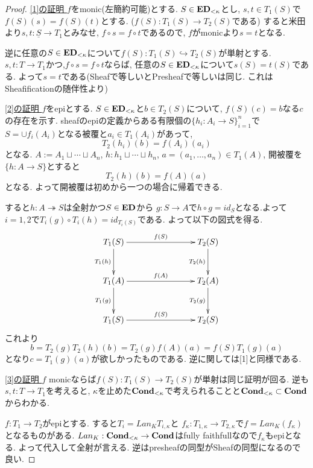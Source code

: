 \documentclass[dvipdfmx,a4paper,11pt]{report}
\theoremstyle{definition}
\begin{document}
 \begin{proof}
 
 \underline{[1]の証明 }
 $f$をmonic(左簡約可能)とする.
$S \in {\bf ED}_{<\kappa}$とし,
$s,t \in T_1(S)$で$f(S)(s)= f(S)(t)$とする. ($f(S) : T_1(S) \to T_2(S)$である)
すると米田より$s,t : \underline{S} \to T_1$とみなせ, $f \circ s = f \circ t$であるので, $f$がmonicより$s=t$となる.

逆に任意の$S \in {\bf ED}_{<\kappa}$について$f(S) : T_1(S) \hookrightarrow T_2(S)$が単射とする.
$s,t : T \to T_1$かつ,$f \circ s = f \circ t$ならば, 任意の$S \in {\bf ED}_{<\kappa}$について$s(S) = t(S)$である. よって$s=t$である(Sheafで等しいとPresheafで等しいは同じ.  これはSheafificationの随伴性より)

 \underline{[2]の証明 }
$f$をepiとする. 
$S \in {\bf ED}_{<\kappa}$と$b \in T_2(S)$について,
$f(S)(c)=b$なる$c$の存在を示す. 
sheafのepiの定義からある有限個の$\{h_i : A_i \to S \}_{i=1}^{n}$で$S=\cup f_i(A_i)$となる被覆と$a_i \in T_1(A_i)$があって, 
$$
T_2(h_i)(b) = f(A_i)(a_i)
$$
となる.
$A:= A_1 \sqcup \cdots \sqcup A_n$, $h : h_1 \sqcup \cdots \sqcup h_n$, $a=(a_1, \ldots, a_n)\in T_{1}(A)$, 
開被覆を$\{ h: A \to S \}$とすると
$$
T_2(h)(b)=f(A)(a) 
$$
となる. よって開被覆は初めから一つの場合に帰着できる.
 
 すると$h : A \twoheadrightarrow S$は全射かつ$S \in { \bf ED}$から
 $g : S \to A$で$h \circ g = id_{S}$となる.よって$i=1,2$で$T_i(g) \circ T_i(h) = id_{T_i(S)}$である.
 よって以下の図式を得る.
 \begin{equation*}
 \xymatrix@C=80pt@R=30pt{
T_1(S)\ar@{->}[r]^{f(S)}
\ar@{->}[d]_{T_1(h)}
&T_2(S)\ar@{->}[d]_{T_2(h)}
 \\   
T_1(A) \ar@{->}[r]^{f(A)}
\ar@{->}[d]_{T_1(g)}
&T_2(A)\ar@{->}[d]_{T_2(g)}
\\
T_1(S)\ar@{->}[r]^{f(S)}
&T_2(S)
 \\   
}
\end{equation*}
これより
$$
b=  T_2(g)T_2(h)(b)
=T_2(g)f(A)(a)
 =f(S)T_1(g)(a)
$$
となり$ c = T_1(g)(a)$が欲しかったものである.
逆に関しては[1]と同様である.

 \underline{[3]の証明 }
$f$ monicならば$f(S) : T_1(S) \to T_2(S)$が単射は同じ証明が回る.
逆も$s,t: T\to T_1$を考えると, $\kappa$を止めた${\bf Cond}_{<\kappa}$で考えられることと${\bf Cond}_{<\kappa} \subset {\bf Cond}$からわかる. 

$f: T_1 \to T_2$がepiとする. 
すると$T_i = Lan_{K}T_{i, \kappa}$と
$f_{\kappa}: T_{1, \kappa} \to T_{2, \kappa}$で$f = Lan_{K}(f_{\kappa})$となるものがある.
$Lan_{K} : {\bf Cond}_{<\kappa} \to {\bf Cond}$はfully faithfullなので$f_{\kappa}$もepiとなる. 
よって代入して全射が言える. 
逆はpresheafの同型がSheafの同型になるので良い.


\end{proof}
\end{document}
